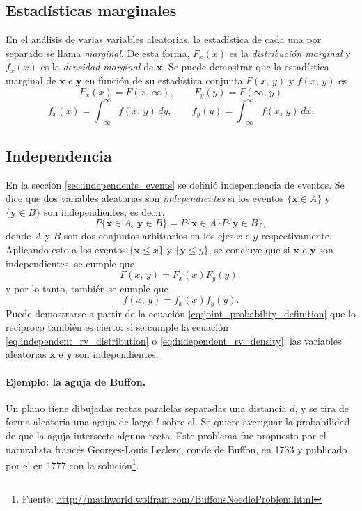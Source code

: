 \documentclass[a4paper]{report}
\newcommand{\x}{\mathbf{x}}
\newcommand{\y}{\mathbf{y}}
\begin{document}
\subsection{Estadísticas marginales}\label{sec:marginal_statisctics_two_rv}
En el análisis de varias variables aleatorias, la estadística de cada una por separado se llama \emph{marginal}. De esta forma, \(F_x(x)\) es la \emph{distribución marginal} y \(f_x(x)\) es la \emph{densidad marginal} de \(\x\). Se puede demostrar que la estadística marginal de \(\x\) e \(\y\) en función de su estadística conjunta \(F(x,\,y)\) y \(f(x,\,y)\) es
\[
 F_x(x)=F(x,\,\infty),\qquad F_y(y)=F(\infty,\,y)
\]
\begin{equation}\label{eq:marginal_densities_definition}
 f_x(x)=\int_{-\infty}^{\infty}f(x,\,y)\,dy,\qquad f_y(y)=\int_{-\infty}^{\infty}f(x,\,y)\,dx.
\end{equation}

\subsection{Independencia}\label{sec:independence}

En la sección \ref{sec:independents_events} se definió independencia de eventos. Se dice que dos variables aleatorias son \emph{independientes} si los eventos \(\{\x\in A\}\) y \(\{\y\in B\}\) son independientes, es decir,
\[
 P\{\x\in A,\,\y\in B\}=P\{\x\in A\}P\{\y\in B\},
\]
donde \(A\) y \(B\) son dos conjuntos arbitrarios en los ejes \(x\) e \(y\) respectivamente. Aplicando esto a los eventos \(\{\x\leq x\}\) y \(\{\y\leq y\}\), se concluye que si \(\x\) e \(\y\) son independientes, se cumple que
\begin{equation}\label{eq:independent_rv_distribution}
 F(x,\,y)=F_x(x)F_y(y),
\end{equation}
y por lo tanto, también se cumple que
\begin{equation}\label{eq:independent_rv_density}
 f(x,\,y)=f_x(x)f_y(y).
\end{equation}
Puede demostrarse a partir de la ecuación \ref{eq:joint_probability_definition} que lo recíproco también es cierto: si se cumple la ecuación \ref{eq:independent_rv_distribution} o \ref{eq:independent_rv_density}, las variables aleatorias \(\x\) e \(\y\) son independientes.

\paragraph{Ejemplo: la aguja de Buffon.} Un plano tiene dibujadas rectas paralelas separadas una distancia \(d\), y se tira de forma aleatoria una aguja de largo \(l\) sobre el. Se quiere averiguar la probabilidad de que la aguja intersecte alguna recta. Este problema fue propuesto por el naturalista francés Georges-Louis Leclerc, conde de Buffon, en 1733 y publicado por el en 1777 con la solución\footnote{Fuente: \url{http://mathworld.wolfram.com/BuffonsNeedleProblem.html}}.
\end{document}
